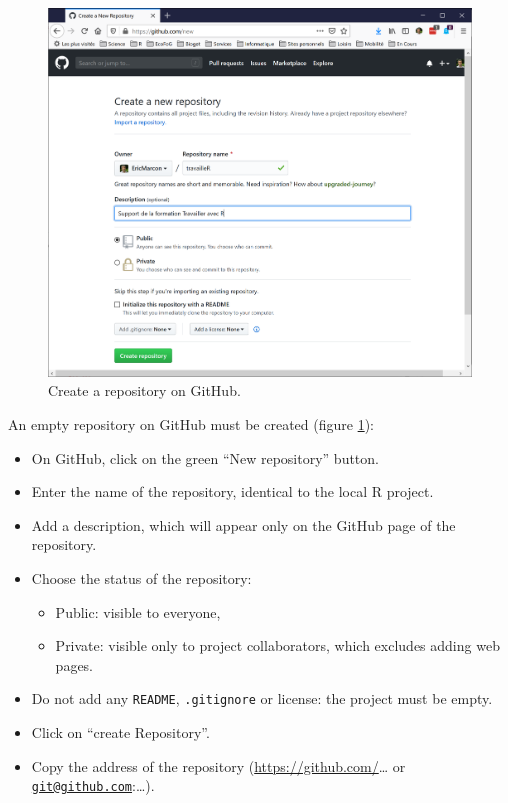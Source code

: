 \documentclass[
  12pt,
  american,
  a4paper,
  extrafontsizes,onecolumn,openright
  ]{memoir}
\providecommand{\tightlist}{%
  \setlength{\itemsep}{0pt}\setlength{\parskip}{0pt}}
\begin{document}
\scriptsize

\begin{figure}

{\centering \includegraphics[width=0.8\linewidth]{images/CreateRepo} 

}

\caption{Create a repository on GitHub.}\label{fig:CreateRepo}
\end{figure}

\normalsize

An empty repository on GitHub must be created (figure \ref{fig:CreateRepo}):

\begin{itemize}
\tightlist
\item
  On GitHub, click on the green \enquote{New repository} button.
\item
  Enter the name of the repository, identical to the local R project.
\item
  Add a description, which will appear only on the GitHub page of the repository.
\item
  Choose the status of the repository:

  \begin{itemize}
  \tightlist
  \item
    Public: visible to everyone,
  \item
    Private: visible only to project collaborators, which excludes adding web pages.
  \end{itemize}
\item
  Do not add any \texttt{README}, \texttt{.gitignore} or license: the project must be empty.
\item
  Click on \enquote{create Repository}.
\item
  Copy the address of the repository (\url{https://github.com/}\ldots{} or \href{mailto:git@github.com}{\nolinkurl{git@github.com}}:\ldots).
\end{itemize}
\end{document}
